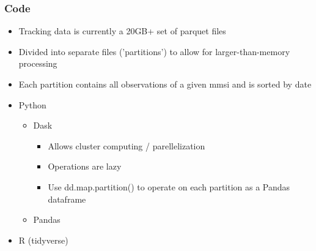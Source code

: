 \documentclass{beamer}
\begin{document}

\begin{frame}
\frametitle{Code}
\begin{itemize}
    \item Tracking data is currently a 20GB+ set of parquet files
    \item Divided into separate files ('partitions') to allow for larger-than-memory processing
    \item Each partition contains all observations of a given mmsi and is sorted by date
\end{itemize}

\begin{itemize}
    \item Python
    \begin{itemize}
        \item Dask
        \begin{itemize}
            \item Allows cluster computing / parellelization
            \item Operations are lazy
            \item Use dd.map.partition() to operate on each partition as a Pandas dataframe
        \end{itemize}
        \item Pandas
    \end{itemize}
    \item R (tidyverse)
\end{itemize}

\end{frame}

\end{document}
